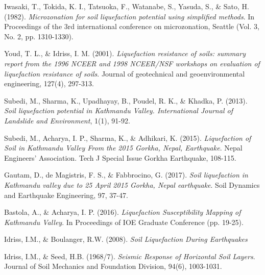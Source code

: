 \begin{thebibliography}{99}
Iwasaki, T., Tokida, K. I., Tatsuoka, F., Watanabe, S., Yasuda, S., \& Sato, H. (1982). \emph{Microzonation for soil liquefaction potential using simplified methods}. In Proceedings of the 3rd international conference on microzonation, Seattle (Vol. 3, No. 2, pp. 1310-1330).

Youd, T. L., \& Idriss, I. M. (2001). \emph{Liquefaction resistance of soils: summary report from the 1996 NCEER and 1998 NCEER/NSF workshops on evaluation of liquefaction resistance of soils}. Journal of geotechnical and geoenvironmental engineering, 127(4), 297-313.

Subedi, M., Sharma, K., Upadhayay, B., Poudel, R. K., \& Khadka, P. (2013). \emph{Soil liquefaction potential in Kathmandu Valley. International Journal of Landslide and Environment}, 1(1), 91-92.

Subedi, M., Acharya, I. P., Sharma, K., \& Adhikari, K. (2015). \emph{Liquefaction of Soil in Kathmandu Valley From the 2015 Gorkha, Nepal, Earthquake}. Nepal Engineers’ Association. Tech J Special Issue Gorkha Earthquake, 108-115.

Gautam, D., de Magistris, F. S., \& Fabbrocino, G. (2017). \emph{Soil liquefaction in Kathmandu valley due to 25 April 2015 Gorkha, Nepal earthquake}. Soil Dynamics and Earthquake Engineering, 97, 37-47.

Bastola, A., \& Acharya, I. P. (2016). \emph{Liquefaction Susceptibility Mapping of Kathmandu Valley}. In Proceedings of IOE Graduate Conference (pp. 19-25).

Idriss, I.M., \& Boulanger, R.W. (2008). \emph{Soil Liquefaction During Earthquakes}

Idriss, I.M., \& Seed, H.B. (1968/7). \emph{Seismic Response of Horizontal Soil Layers}. Journal of Soil Mechanics and Foundation Division, 94(6), 1003-1031.

\end{thebibliography}